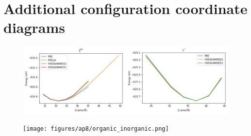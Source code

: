 \chapter{\label{app:9-configcoord}Additional configuration coordinate diagrams}

\begin{figure}[h!]   %
\centering
  \includegraphics[width=0.7\columnwidth]{figures/ap9/cc_theory.png}
  \caption[]{}
\label{schrodinger}
\end{figure}


\begin{figure}[h!]   %
\centering
  \texttt{[image: figures/ap8/organic\_inorganic.png]}
  \caption[]{}
\label{schrodinger}
\end{figure}